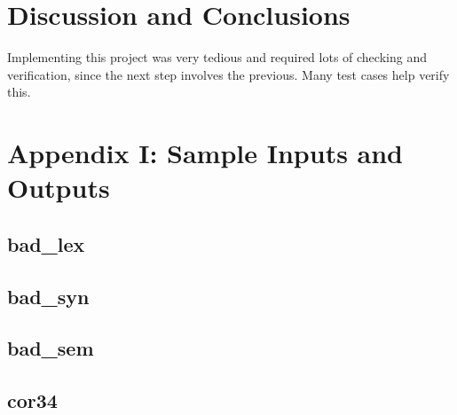 \documentclass[titlepage]{article}
\begin{document}
\section*{Discussion and Conclusions}
Implementing this project was very tedious and required
lots of checking and verification, since the
next step involves the previous. Many test cases
help verify this.



\clearpage{}
\section*{Appendix I: Sample Inputs and Outputs}
\lstset{language=Pascal}
\subsection*{bad\_lex}



\clearpage{}
\subsection*{bad\_syn}



\begin{multicols}{2}
  
\end{multicols}
\clearpage{}
\subsection*{bad\_sem}



\begin{multicols}{2}
  
\end{multicols}
\clearpage{}
\subsection*{cor34}

\clearpage{}

\clearpage{}

\begin{multicols}{2}
  
\end{multicols}
\clearpage{}
\end{document}
